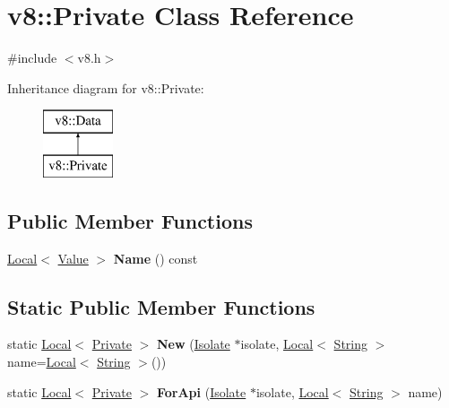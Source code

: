 \hypertarget{classv8_1_1_private}{}\section{v8\+:\+:Private Class Reference}
\label{classv8_1_1_private}


{\ttfamily \#include $<$v8.\+h$>$}

Inheritance diagram for v8\+:\+:Private\+:\begin{figure}[H]
\begin{center}
\leavevmode
\includegraphics[height=2.000000cm]{classv8_1_1_private}
\end{center}
\end{figure}
\subsection*{Public Member Functions}
\begin{DoxyCompactItemize}
\item 
\hyperlink{classv8_1_1_local}{Local}$<$ \hyperlink{classv8_1_1_value}{Value} $>$ {\bfseries Name} () const \hypertarget{classv8_1_1_private_a92fec85b3b4d5baaada9795ef628c511}{}\label{classv8_1_1_private_a92fec85b3b4d5baaada9795ef628c511}

\end{DoxyCompactItemize}
\subsection*{Static Public Member Functions}
\begin{DoxyCompactItemize}
\item 
static \hyperlink{classv8_1_1_local}{Local}$<$ \hyperlink{classv8_1_1_private}{Private} $>$ {\bfseries New} (\hyperlink{classv8_1_1_isolate}{Isolate} $\ast$isolate, \hyperlink{classv8_1_1_local}{Local}$<$ \hyperlink{classv8_1_1_string}{String} $>$ name=\hyperlink{classv8_1_1_local}{Local}$<$ \hyperlink{classv8_1_1_string}{String} $>$())\hypertarget{classv8_1_1_private_ac23e6937de502a4aa3e239e67c6c3c2e}{}\label{classv8_1_1_private_ac23e6937de502a4aa3e239e67c6c3c2e}

\item 
static \hyperlink{classv8_1_1_local}{Local}$<$ \hyperlink{classv8_1_1_private}{Private} $>$ {\bfseries For\+Api} (\hyperlink{classv8_1_1_isolate}{Isolate} $\ast$isolate, \hyperlink{classv8_1_1_local}{Local}$<$ \hyperlink{classv8_1_1_string}{String} $>$ name)\hypertarget{classv8_1_1_private_a1a6d7c68b6761bd4b8134e4a46dbf263}{}\label{classv8_1_1_private_a1a6d7c68b6761bd4b8134e4a46dbf263}

\end{DoxyCompactItemize}


